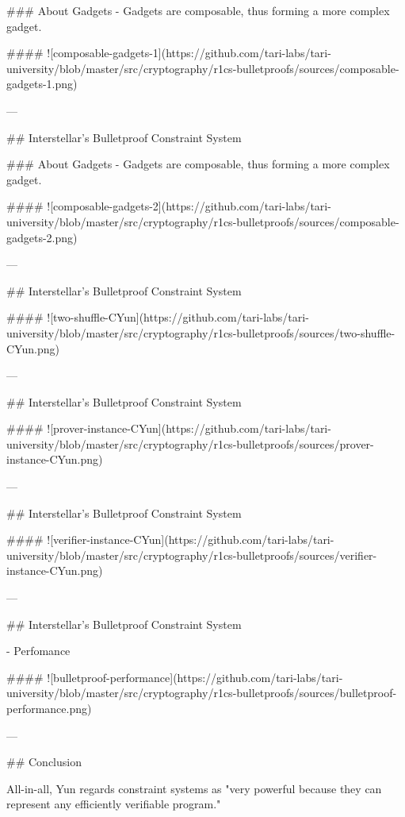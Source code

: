 ### About Gadgets 
   - Gadgets are composable, thus forming a more complex gadget.

#### ![composable-gadgets-1](https://github.com/tari-labs/tari-university/blob/master/src/cryptography/r1cs-bulletproofs/sources/composable-gadgets-1.png)

---

## Interstellar's Bulletproof Constraint System 

### About Gadgets 
   - Gadgets are composable, thus forming a more complex gadget.

#### ![composable-gadgets-2](https://github.com/tari-labs/tari-university/blob/master/src/cryptography/r1cs-bulletproofs/sources/composable-gadgets-2.png)

--- 

## Interstellar's Bulletproof Constraint System 

#### ![two-shuffle-CYun](https://github.com/tari-labs/tari-university/blob/master/src/cryptography/r1cs-bulletproofs/sources/two-shuffle-CYun.png) 

--- 

## Interstellar's Bulletproof Constraint System 

#### ![prover-instance-CYun](https://github.com/tari-labs/tari-university/blob/master/src/cryptography/r1cs-bulletproofs/sources/prover-instance-CYun.png) 

--- 

## Interstellar's Bulletproof Constraint System 

#### ![verifier-instance-CYun](https://github.com/tari-labs/tari-university/blob/master/src/cryptography/r1cs-bulletproofs/sources/verifier-instance-CYun.png)

--- 

## Interstellar's Bulletproof Constraint System 

  - Perfomance 
  
#### ![bulletproof-performance](https://github.com/tari-labs/tari-university/blob/master/src/cryptography/r1cs-bulletproofs/sources/bulletproof-performance.png)  
  
   
--- 

## Conclusion

All-in-all, Yun regards constraint systems as "very powerful because they can represent any efficiently 
verifiable program." 



 
